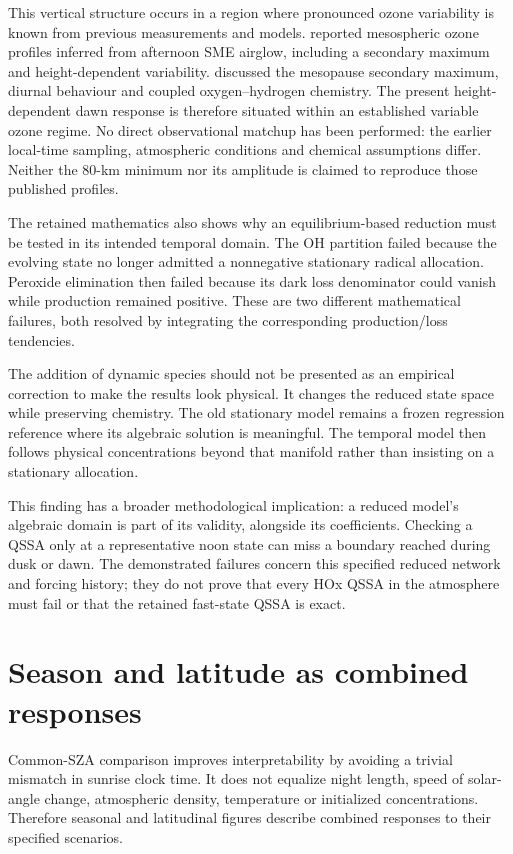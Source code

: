 This vertical structure occurs in a region where pronounced ozone variability is known from previous measurements and models. \citet{thomas1983} reported mesospheric ozone profiles inferred from afternoon SME airglow, including a secondary maximum and height-dependent variability. \citet{allen1984} discussed the mesopause secondary maximum, diurnal behaviour and coupled oxygen--hydrogen chemistry. The present height-dependent dawn response is therefore situated within an established variable ozone regime. No direct observational matchup has been performed: the earlier local-time sampling, atmospheric conditions and chemical assumptions differ. Neither the 80-km minimum nor its amplitude is claimed to reproduce those published profiles.

The retained mathematics also shows why an equilibrium-based reduction must be tested in its intended temporal domain. The OH partition failed because the evolving state no longer admitted a nonnegative stationary radical allocation. Peroxide elimination then failed because its dark loss denominator could vanish while production remained positive. These are two different mathematical failures, both resolved by integrating the corresponding production/loss tendencies.

The addition of dynamic species should not be presented as an empirical correction to make the results look physical. It changes the reduced state space while preserving chemistry. The old stationary model remains a frozen regression reference where its algebraic solution is meaningful. The temporal model then follows physical concentrations beyond that manifold rather than insisting on a stationary allocation.

This finding has a broader methodological implication: a reduced model's algebraic domain is part of its validity, alongside its coefficients. Checking a QSSA only at a representative noon state can miss a boundary reached during dusk or dawn. The demonstrated failures concern this specified reduced network and forcing history; they do not prove that every HOx QSSA in the atmosphere must fail or that the retained fast-state QSSA is exact.

\section{Season and latitude as combined responses}
Common-SZA comparison improves interpretability by avoiding a trivial mismatch in sunrise clock time. It does not equalize night length, speed of solar-angle change, atmospheric density, temperature or initialized concentrations. Therefore seasonal and latitudinal figures describe combined responses to their specified scenarios.

